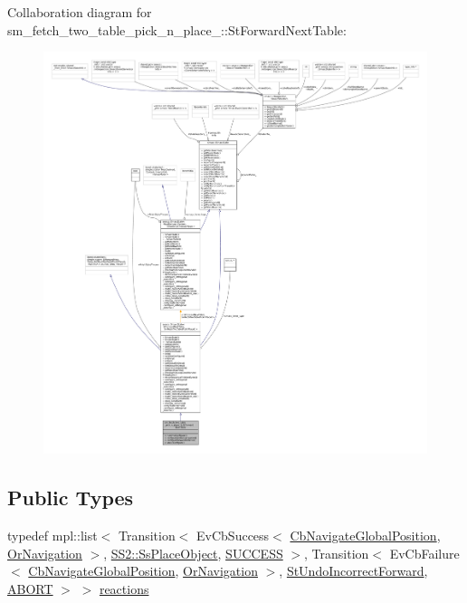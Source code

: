 Collaboration diagram for sm\+\_\+fetch\+\_\+two\+\_\+table\+\_\+pick\+\_\+n\+\_\+place\+\_\+:\+:St\+Forward\+Next\+Table\+:
\nopagebreak
\begin{figure}[H]
\begin{center}
\leavevmode
\includegraphics[width=350pt]{structsm__fetch__two__table__pick__n__place__1_1_1StForwardNextTable__coll__graph}
\end{center}
\end{figure}
\subsection*{Public Types}
\begin{DoxyCompactItemize}
\item 
typedef mpl\+::list$<$ Transition$<$ Ev\+Cb\+Success$<$ \hyperlink{classcl__move__base__z_1_1CbNavigateGlobalPosition}{Cb\+Navigate\+Global\+Position}, \hyperlink{classsm__fetch__two__table__pick__n__place__1_1_1OrNavigation}{Or\+Navigation} $>$, \hyperlink{structsm__fetch__two__table__pick__n__place__1_1_1SS2_1_1SsPlaceObject}{S\+S2\+::\+Ss\+Place\+Object}, \hyperlink{classSUCCESS}{S\+U\+C\+C\+E\+SS} $>$, Transition$<$ Ev\+Cb\+Failure$<$ \hyperlink{classcl__move__base__z_1_1CbNavigateGlobalPosition}{Cb\+Navigate\+Global\+Position}, \hyperlink{classsm__fetch__two__table__pick__n__place__1_1_1OrNavigation}{Or\+Navigation} $>$, \hyperlink{structsm__fetch__two__table__pick__n__place__1_1_1StUndoIncorrectForward}{St\+Undo\+Incorrect\+Forward}, \hyperlink{classABORT}{A\+B\+O\+RT} $>$ $>$ \hyperlink{structsm__fetch__two__table__pick__n__place__1_1_1StForwardNextTable_a39ccca708ce11206c24873c140667b75}{reactions}
\end{DoxyCompactItemize}

